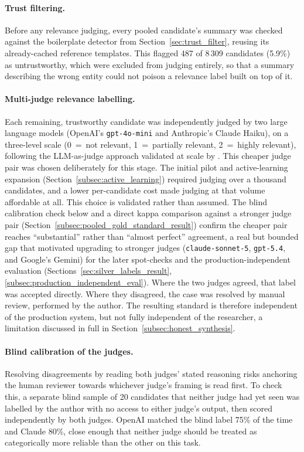 \documentclass[a4paper,oneside,bibliography=totoc]{scrbook}
\begin{document}
\paragraph{Trust filtering.} Before any relevance judging, every pooled candidate's summary was checked against the boilerplate detector from Section~\ref{sec:trust_filter}, reusing its already-cached reference templates. This flagged 487 of 8\,309 candidates (5.9\%) as untrustworthy, which were excluded from judging entirely, so that a summary describing the wrong entity could not poison a relevance label built on top of it.

\paragraph{Multi-judge relevance labelling.} Each remaining, trustworthy candidate was independently judged by two large language models (OpenAI's \texttt{gpt-4o-mini} and Anthropic's Claude Haiku), on a three-level scale (0~=~not relevant, 1~=~partially relevant, 2~=~highly relevant), following the LLM-as-judge approach validated at scale by \citet{thomas2024llmjudge}. This cheaper judge pair was chosen deliberately for this stage. The initial pilot and active-learning expansion (Section~\ref{subsec:active_learning}) required judging over a thousand candidates, and a lower per-candidate cost made judging at that volume affordable at all. This choice is validated rather than assumed. The blind calibration check below and a direct kappa comparison against a stronger judge pair (Section~\ref{subsec:pooled_gold_standard_result}) confirm the cheaper pair reaches ``substantial'' rather than ``almost perfect'' agreement, a real but bounded gap that motivated upgrading to stronger judges (\texttt{claude-sonnet-5}, \texttt{gpt-5.4}, and Google's Gemini) for the later spot-checks and the production-independent evaluation (Sections~\ref{sec:silver_labels_result}, \ref{subsec:production_independent_eval}). Where the two judges agreed, that label was accepted directly. Where they disagreed, the case was resolved by manual review, performed by the author. The resulting standard is therefore independent of the production system, but not fully independent of the researcher, a limitation discussed in full in Section~\ref{subsec:honest_synthesis}.

\paragraph{Blind calibration of the judges.} Resolving disagreements by reading both judges' stated reasoning risks anchoring the human reviewer towards whichever judge's framing is read first. To check this, a separate blind sample of 20 candidates that neither judge had yet seen was labelled by the author with no access to either judge's output, then scored independently by both judges. OpenAI matched the blind label 75\% of the time and Claude 80\%, close enough that neither judge should be treated as categorically more reliable than the other on this task.
\end{document}
